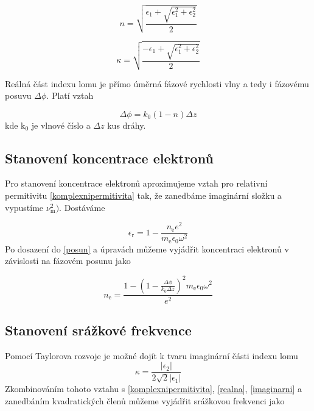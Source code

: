 \documentclass[a4paper,12pt]{article}
\begin{document}
\begin{equation}
	n = \sqrt{\frac{\epsilon_1 + \sqrt{\epsilon_1^2 + \epsilon_2^2}}{2}}
	\label{realna}
\end{equation}

\begin{equation}
	\kappa = \sqrt{\frac{-\epsilon_1 + \sqrt{\epsilon_1^2 + \epsilon_2^2}}{2}}
	\label{imaginarni}
\end{equation}

Reálná část indexu lomu je
přímo úměrná fázové rychlosti vlny a tedy i fázovému posuvu $\Delta\phi$. Platí vztah

\begin{equation}
 	\Delta\phi = k_0(1-n) \Delta z
 	\label{posun}
\end{equation}
kde k$_0$ je vlnové číslo a $\Delta z$ kus dráhy.  

\subsection{Stanovení koncentrace elektronů}
Pro stanovení koncentrace elektronů aproximujeme vztah pro relativní permitivitu 
\eqref{komplexnipermitivita} tak, že zanedbáme imaginární složku a vypustíme 
$\nu_\text{m}^2)$. Dostáváme

\begin{equation}
	\epsilon_\text{r} = 1- \frac{n_\text{e} e^2}{m_\text{e} \epsilon_0 \omega^2}
	\label{permitivita}
\end{equation}
Po dosazení do \eqref{posun} a úpravách můžeme vyjádřit koncentraci elektronů
v závislosti na fázovém posunu jako

\begin{equation}
	n_\text{e} = \frac{1-\left(1- \frac{\Delta\phi}{k_0 \Delta z} \right)^2
	m_\text{e} \epsilon_0 \omega^2}{e^2}
\end{equation}

\subsection{Stanovení srážkové frekvence}
Pomocí Taylorova rozvoje je možné dojít k tvaru imaginární části indexu lomu
\begin{equation}
	\kappa = \frac{|\epsilon_2|}{2\sqrt{2}|\epsilon_1|}
\end{equation}
Zkombinováním tohoto vztahu s \eqref{komplexnipermitivita}, \eqref{realna}, \eqref{imaginarni} a zanedbáním kvadratických členů můžeme vyjádřit srážkovou frekvenci jako
\end{document}
